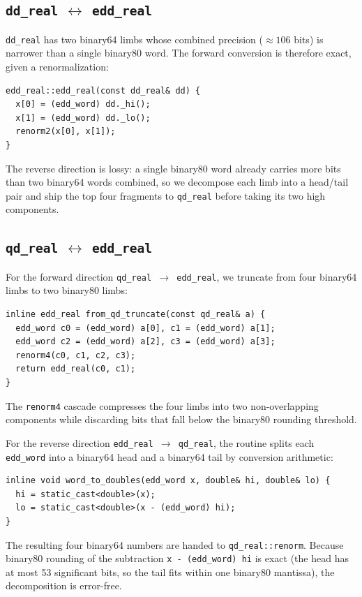 \documentclass[11pt,a4paper]{article}
\begin{document}
\subsection{\texttt{dd\_real} $\leftrightarrow$ \texttt{edd\_real}}

\texttt{dd\_real} has two binary64 limbs whose combined precision
($\approx 106$ bits) is narrower than a single binary80 word.
The forward conversion is therefore exact, given a renormalization:
\begin{lstlisting}
edd_real::edd_real(const dd_real& dd) {
  x[0] = (edd_word) dd._hi();
  x[1] = (edd_word) dd._lo();
  renorm2(x[0], x[1]);
}
\end{lstlisting}
The reverse direction is lossy: a single binary80 word already
carries more bits than two binary64 words combined, so we
decompose each limb into a head/tail pair and ship the top four
fragments to \texttt{qd\_real} before taking its two high
components.

\subsection{\texttt{qd\_real} $\leftrightarrow$ \texttt{edd\_real}}

For the forward direction \texttt{qd\_real $\to$ edd\_real}, we
truncate from four binary64 limbs to two binary80 limbs:
\begin{lstlisting}
inline edd_real from_qd_truncate(const qd_real& a) {
  edd_word c0 = (edd_word) a[0], c1 = (edd_word) a[1];
  edd_word c2 = (edd_word) a[2], c3 = (edd_word) a[3];
  renorm4(c0, c1, c2, c3);
  return edd_real(c0, c1);
}
\end{lstlisting}
The \texttt{renorm4} cascade compresses the four limbs into two
non-overlapping components while discarding bits that fall below
the binary80 rounding threshold.

For the reverse direction \texttt{edd\_real $\to$ qd\_real}, the
routine splits each \texttt{edd\_word} into a binary64 head and a
binary64 tail by conversion arithmetic:
\begin{lstlisting}
inline void word_to_doubles(edd_word x, double& hi, double& lo) {
  hi = static_cast<double>(x);
  lo = static_cast<double>(x - (edd_word) hi);
}
\end{lstlisting}
The resulting four binary64 numbers are handed to
\texttt{qd\_real::renorm}.  Because binary80 rounding of the
subtraction \texttt{x - (edd\_word) hi} is exact (the head has at
most 53 significant bits, so the tail fits within one binary80
mantissa), the decomposition is error-free.
\end{document}
